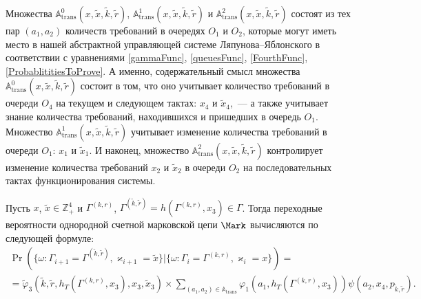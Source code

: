 Множества ${\mathbb A}_{\mathrm{trans}}^0(x,  \tilde{x},  \tilde{k},  \tilde{r})$,   ${\mathbb A}_{\mathrm{trans}}^1(x,  \tilde{x},  \tilde{k},  \tilde{r})$ и ${\mathbb A}_{\mathrm{trans}}^2(x,  \tilde{x},  \tilde{k},  \tilde{r})$ состоят из тех пар $(a_1,  a_2)$ количеств требований в очередях $O_1$ и $O_2$,   которые могут иметь место в нашей абстрактной управляющей системе Ляпунова--Яблонского в соответствии с уравнениями \eqref{gammaFunc},   \eqref{queuesFunc},   \eqref{FourthFunc},   \eqref{ProbablititiesToProve}. А именно,   содержательный смысл множества  ${\mathbb A}_{\mathrm{trans}}^0(x,  \tilde{x},  \tilde{k},  \tilde{r})$ состоит в том,   что оно учитывает количество требований в очереди $O_4$ на текущем и следующем тактах: $x_4$ и $\tilde{x}_4$,~--- а также учитывает знание количества требований,  находившихся и пришедших в очередь $O_1$. Множество ${\mathbb A}_{\mathrm{trans}}^1(x,  \tilde{x},  \tilde{k},  \tilde{r})$ учитывает изменение количества требований в очереди $O_1$: $x_1$ и $\tilde{x}_1$. И наконец,   множество 
${\mathbb A}_{\mathrm{trans}}^2(x,  \tilde{x},  \tilde{k},  \tilde{r})$ контролирует изменение количества требований $x_2$ и $\tilde{x}_2$ в очереди $O_2$ на последовательных тактах функционирования системы.
\begin{theorem}
Пусть $x$,   $\tilde{x}\in \mathbb{Z}_+^4$ и $\Gamma^{(k,  r)}$,   $\Gamma^{(\tilde{k},  \tilde{r})}=h(\Gamma^{(k,  r)},  x_3) \in \Gamma$. Тогда переходные вероятности однородной счетной марковской цепи $\Mark$ вычисляются по следующей формуле:
\begin{multline}
\Pr (\{\omega\colon \Gamma_{i+1}=\Gamma^{(\tilde{k},  \tilde{r})},  \varkappa_{i+1}=\tilde{x} \}| \{\omega\colon \Gamma_{i}=\Gamma^{(k,  r)},  \varkappa_i=x\})=\\ 
=\widetilde{\varphi}_3(\tilde{k},  \tilde{r},  h_T(\Gamma^{(k,  r)},  x_3),  x_3,  \tilde{x}_3)\times
\sum_{(a_1,  a_2)\in {\mathbb A}_{\mathrm{trans}}}\varphi_1(a_1,  h_T(\Gamma^{(k,  r)},  x_3))  \psi(a_2,  x_4,   p_{\tilde{k},  \tilde{r}}).
\label{transitionToProve}
\end{multline}
\end{theorem}
